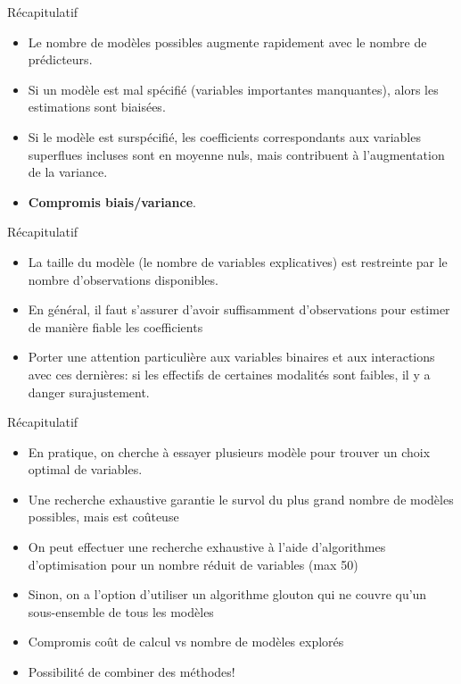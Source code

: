 \documentclass[
  ignorenonframetext,
]{beamer}
\providecommand{\tightlist}{%
  \setlength{\itemsep}{0pt}\setlength{\parskip}{0pt}}\usepackage{longtable,booktabs,array}
\begin{document}
\begin{frame}{Récapitulatif}
\protect\hypertarget{ruxe9capitulatif}{}
\begin{itemize}
\tightlist
\item
  Le nombre de modèles possibles augmente rapidement avec le nombre de
  prédicteurs.
\item
  Si un modèle est mal spécifié (variables importantes manquantes),
  alors les estimations sont biaisées.
\item
  Si le modèle est surspécifié, les coefficients correspondants aux
  variables superflues incluses sont en moyenne nuls, mais contribuent à
  l'augmentation de la variance.
\item
  \textbf{Compromis biais/variance}.
\end{itemize}
\end{frame}

\begin{frame}{Récapitulatif}
\protect\hypertarget{ruxe9capitulatif-1}{}
\begin{itemize}
\tightlist
\item
  La taille du modèle (le nombre de variables explicatives) est
  restreinte par le nombre d'observations disponibles.
\item
  En général, il faut s'assurer d'avoir suffisamment d'observations pour
  estimer de manière fiable les coefficients
\item
  Porter une attention particulière aux variables binaires et aux
  interactions avec ces dernières: si les effectifs de certaines
  modalités sont faibles, il y a danger surajustement.
\end{itemize}
\end{frame}

\begin{frame}{Récapitulatif}
\protect\hypertarget{ruxe9capitulatif-2}{}
\begin{itemize}
\tightlist
\item
  En pratique, on cherche à essayer plusieurs modèle pour trouver un
  choix optimal de variables.
\item
  Une recherche exhaustive garantie le survol du plus grand nombre de
  modèles possibles, mais est coûteuse
\item
  On peut effectuer une recherche exhaustive à l'aide d'algorithmes
  d'optimisation pour un nombre réduit de variables (max 50)
\item
  Sinon, on a l'option d'utiliser un algorithme glouton qui ne couvre
  qu'un sous-ensemble de tous les modèles
\item
  Compromis coût de calcul vs nombre de modèles explorés
\item
  Possibilité de combiner des méthodes!
\end{itemize}
\end{frame}
\end{document}
